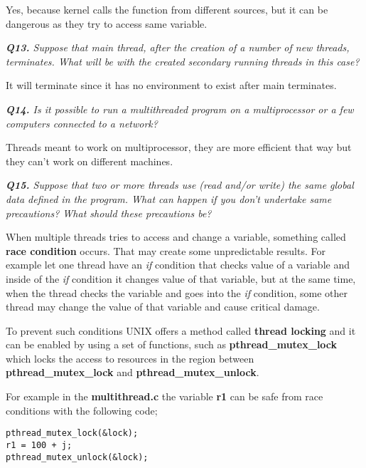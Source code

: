 \documentclass[11pt]{article}
\begin{document}
Yes, because kernel calls the function from different sources, but it can be dangerous as they try to access same variable.

\vspace{5mm}
\textit{\textbf{Q13.} Suppose that main thread, after the creation of a number of new threads, terminates. What will be with the created secondary running threads in this case?}
\vspace{5mm}

It will terminate since it has no environment to exist after main terminates.

\vspace{5mm}
\textit{\textbf{Q14.} Is it possible to run a multithreaded program on a multiprocessor or a few computers connected to a network?}
\vspace{5mm}

Threads meant to work on multiprocessor, they are more efficient that way but they can't work on different machines.

\vspace{5mm}
\textit{\textbf{Q15.} Suppose that two or more threads use (read and/or write) the same global data defined in the program. What can happen if you don't undertake same precautions? What should these precautions be?}
\vspace{5mm}

When multiple threads tries to access and change a variable, something called \textbf{race condition} occurs. That may create some unpredictable results. For example let one thread have an \textit{if} condition that checks value of a variable and inside of the \textit{if} condition it changes value of that variable, but at the same time, when the thread checks the variable and goes into the \textit{if} condition, some other thread may change the value of that variable and cause critical damage.

To prevent such conditions UNIX offers a method called \textbf{thread locking} and it can be enabled by using a set of functions, such as \textbf{pthread\_mutex\_lock} which locks the access to resources in the region between \textbf{pthread\_mutex\_lock} and \textbf{pthread\_mutex\_unlock}.

For example in the \textbf{multithread.c} the variable \textbf{r1} can be safe from race conditions with the following code;

\begin{lstlisting}[frame=tlrb]
pthread_mutex_lock(&lock);
r1 = 100 + j;
pthread_mutex_unlock(&lock);
\end{lstlisting}
\end{document}
